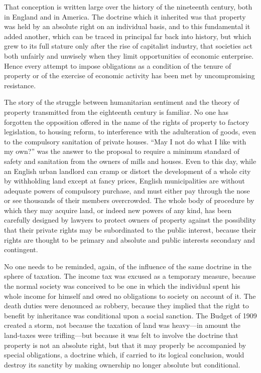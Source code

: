 \documentclass{book}
\begin{document}
That conception is written large over the history of the nineteenth century, both in England and in America. The doctrine which it inherited was that property was held by an absolute right on an individual basis, and to this fundamental it added another, which can be traced in principal far back into history, but which grew to its full stature only after the rise of capitalist industry, that societies act both unfairly and unwisely when they limit opportunities of economic enterprise. Hence every attempt to impose obligations as a condition of the tenure of property or of the exercise of economic activity has been met by uncompromising resistance.

The story of the struggle between humanitarian sentiment and the theory of property transmitted from the eighteenth century is familiar. No one has forgotten the opposition offered in the name of the rights of property to factory legislation, to housing reform, to interference with the adulteration of goods, even to the compulsory sanitation of private houses. “May I not do what I like with my own?” was the answer to the proposal to require a minimum standard of safety and sanitation from the owners of mills and houses. Even to this day, while an English urban landlord can cramp or distort the development of a whole city by withholding land except at fancy prices, English municipalities are without adequate powers of compulsory purchase, and must either pay through the nose or see thousands of their members overcrowded. The whole body of procedure by which they may acquire land, or indeed new powers of any kind, has been carefully designed by lawyers to protect owners of property against the possibility that their private rights may be subordinated to the public interest, because their rights are thought to be primary and absolute and public interests secondary and contingent.

No one needs to be reminded, again, of the influence of the same doctrine in the sphere of taxation. The income tax was excused as a temporary measure, because the normal society was conceived to be one in which the individual spent his whole income for himself and owed no obligations to society on account of it. The death duties were denounced as robbery, because they implied that the right to benefit by inheritance was conditional upon a social sanction. The Budget of 1909 created a storm, not because the taxation of land was heavy—in amount the land-taxes were trifling—but because it was felt to involve the doctrine that property is not an absolute right, but that it may properly be accompanied by special obligations, a doctrine which, if carried to its logical conclusion, would destroy its sanctity by making ownership no longer absolute but conditional.
\end{document}
